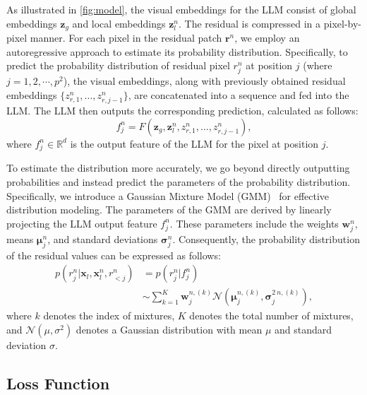 As illustrated in \cref{fig:model}, the visual embeddings for the LLM consist of global embeddings $\mathbf{z}_{g}$ and local embeddings $\mathbf{z}_l^n$. The residual is compressed in a pixel-by-pixel manner. For each pixel in the residual patch $\mathbf{r}^n$, we employ an autoregressive approach to estimate its probability distribution. Specifically, to predict the probability distribution of residual pixel $r_{j}^n$ at position $j$ (where $j=1,2,\cdots,p^2$), the visual embeddings, along with previously obtained residual embeddings $\{z_{r,1}^n,\ldots, z_{r,j-1}^n\}$, are concatenated into a sequence and fed into the LLM. The LLM then outputs the corresponding prediction, calculated as follows:
\begin{equation}
    f_{j}^n=F(\mathbf{z}_g,\mathbf{z}_{l}^n,z_{r,1}^n,\ldots, z_{r,j-1}^n),
\end{equation}
where $ f_{j}^n \in \mathbb{R}^d$ is the output feature of the LLM for the pixel at position $j$.

To estimate the distribution more accurately, we go beyond directly outputting probabilities and instead predict the parameters of the probability distribution. Specifically, we introduce a Gaussian Mixture Model (GMM)~\cite{Cheng_2020_CVPR_DGML} for effective distribution modeling. The parameters of the GMM are derived by linearly projecting the LLM output feature $f^n_j$. These parameters include the weights $\boldsymbol{w}^n_j$, means $\boldsymbol{\mu}^n_j$, and standard deviations $\boldsymbol{\sigma}^n_j$. Consequently, the probability distribution of the residual values can be expressed as follows: 
\begin{equation}
\begin{aligned}
p(r_j^n|\mathbf{x}_l,\mathbf{x}_l^n,r_{<j}^n) &= p(r_j^n|f_{j}^n) \\
&\sim \sum_{k=1}^K \boldsymbol w^{n,(k)}_j \mathcal{N}(\boldsymbol \mu^{n,(k)}_j, \boldsymbol \sigma^{2\ n,(k)}_j),
\end{aligned}
\end{equation}
where $k$ denotes the index of mixtures, $K$ denotes the total number of mixtures, and $\mathcal{N}(\mu,\sigma^2)$ denotes a Gaussian distribution with mean $\mu$ and standard deviation $\sigma$.

\subsection{Loss Function}

